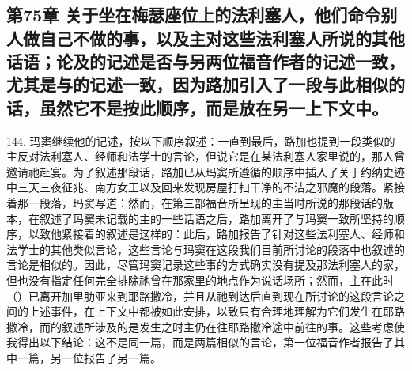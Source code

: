 

\section{}


\subsection{第75章 关于坐在梅瑟座位上的法利塞人，他们命令别人做自己不做的事，以及主对这些法利塞人所说的其他话语；论及的记述是否与另两位福音作者的记述一致，尤其是与的记述一致，因为路加引入了一段与此相似的话，虽然它不是按此顺序，而是放在另一上下文中。}

144. 玛窦继续他的记述，按以下顺序叙述：一直到最后，路加也提到一段类似的主反对法利塞人、经师和法学士的言论，但说它是在某法利塞人家里说的，那人曾邀请祂赴宴。为了叙述那段话，路加已从玛窦所遵循的顺序中插入了关于约纳史迹中三天三夜征兆、南方女王以及回来发现房屋打扫干净的不洁之邪魔的段落。紧接着那一段落，玛窦写道：然而，在第三部福音所呈现的主当时所说的那段话的版本，在叙述了玛窦未记载的主的一些话语之后，路加离开了与玛窦一致所坚持的顺序，以致他紧接着的叙述是这样的：此后，路加报告了针对这些法利塞人、经师和法学士的其他类似言论，这些言论与玛窦在这段我们目前所讨论的段落中也叙述的言论是相似的。因此，尽管玛窦记录这些事的方式确实没有提及那法利塞人的家，但也没有指定任何完全排除祂曾在那家里的地点作为说话场所；然而，主在此时（）已离开加里肋亚来到耶路撒冷，并且从祂到达后直到现在所讨论的这段言论之间的上述事件，在上下文中都被如此安排，以致只有合理地理解为它们发生在耶路撒冷，而的叙述所涉及的是发生之时主仍在往耶路撒冷途中前往的事。这些考虑使我得出以下结论：这不是同一篇，而是两篇相似的言论，第一位福音作者报告了其中一篇，另一位报告了另一篇。\par

